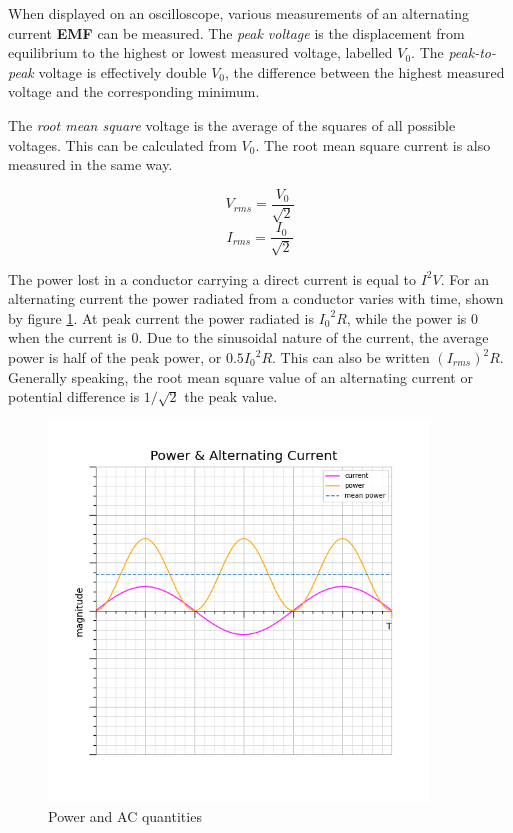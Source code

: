 \documentclass[12pt]{article}
\begin{document}
When displayed on an oscilloscope, various measurements of an alternating current \textbf{EMF} can be measured. The \emph{peak voltage} is the displacement from equilibrium to the highest or lowest measured voltage, labelled \(V_0\). The \emph{peak-to-peak} voltage is effectively double \(V_0\), the difference between the highest measured voltage and the corresponding minimum.

The \emph{root mean square} voltage is the average of the squares of all possible voltages. This can be calculated from \(V_0\). The root mean square current is also measured in the same way.

\begin{figure}[H]
\centering
\begin{minipage}{0.8\textwidth}
\begin{tcolorbox}[
sharp corners=all,
colback=white,
colframe=white,
size=tight,
boxrule=0.2mm,
left=10mm, right=10mm,
]
\begin{multicols}{2}
\noindent
\[V_{rms} = \dfrac{V_0}{\sqrt{2}}\]
\columnbreak
\[I_{rms} = \dfrac{I_0}{\sqrt{2}}\]
\end{multicols}
\end{tcolorbox}
\end{minipage}
\end{figure}

The power lost in a conductor carrying a direct current is equal to \(I^2V\). For an alternating current the power radiated from a conductor varies with time, shown by figure \ref{img:ac_power}. At peak current the power radiated is \({I_0}^2R\), while the power is 0 when the current is 0. Due to the sinusoidal nature of the current, the average power is half of the peak power, or \(0.5 {I_0}^2 R\). This can also be written \((I_{rms})^2R\). Generally speaking, the root mean square value of an alternating current or potential difference is \(1/\sqrt{2}\) the peak value.

\begin{figure}[H]
\centering
\includegraphics[width=0.9\textwidth,keepaspectratio]{./images/ac_power.png}
\caption{Power and AC quantities}
\label{img:ac_power}
\end{figure}
\end{document}
